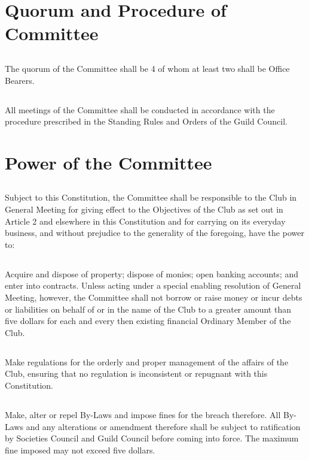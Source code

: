\documentclass[10.5pt]{article}
\begin{document}
\section{Quorum and Procedure of Committee}
\subsection{} The quorum of the Committee shall be 4 of whom at least two shall be Office Bearers.
\subsection{} All meetings of the Committee shall be conducted in accordance with the procedure prescribed
in the Standing Rules and Orders of the Guild Council.
\newline


\section{Power of the Committee}
\subsection{} Subject to this Constitution, the Committee shall be responsible to the Club in General Meeting for giving effect to the Objectives of the Club as set out in Article 2 and elsewhere in this Constitution and for carrying on its everyday business, and without prejudice to the generality of
the foregoing, have the power to:
\subsection{} Acquire and dispose of property; dispose of monies; open banking accounts; and enter into contracts. Unless acting under a special enabling resolution of General Meeting, however, the Committee shall not borrow or raise money or incur debts or liabilities on behalf of or in the name of the Club to a greater amount than five dollars for each and every then existing financial Ordinary Member of the Club.
\subsection{} Make regulations for the orderly and proper management of the affairs of the Club, ensuring that no regulation is inconsistent or repugnant with this Constitution.
\subsection{} Make, alter or repel By-Laws and impose fines for the breach therefore. All By-Laws and any
alterations or amendment therefore shall be subject to ratification by Societies Council and Guild Council before coming into force. The maximum fine imposed may not exceed five dollars.
\newline
\end{document}
